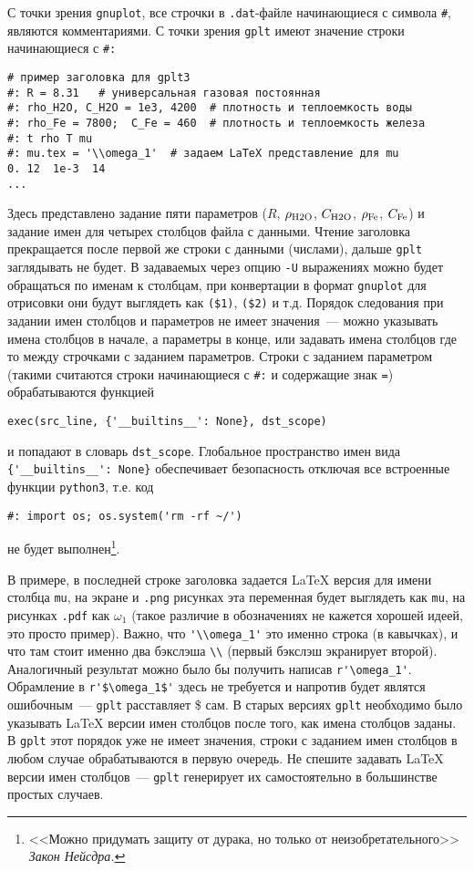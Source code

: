 \documentclass[12pt]{article}
\def\gplt{{\tt gplt}}
\def\gnuplot{{\tt gnuplot}}
\def\python{{\tt python3}}
\def\png{{\tt .png}}
\def\pdf{{\tt .pdf}}
\begin{document}
С точки зрения \gnuplot, все строчки в \verb'.dat'-файле начинающиеся с символа \verb'#', являются комментариями. С точки зрения \gplt{}
имеют значение строки начинающиеся с \verb'#:'
\begin{verbatim}
# пример заголовка для gplt3
#: R = 8.31   # универсальная газовая постоянная
#: rho_H2O, C_H2O = 1e3, 4200  # плотность и теплоемкость воды
#: rho_Fe = 7800;  C_Fe = 460  # плотность и теплоемкость железа
#: t rho T mu
#: mu.tex = '\\omega_1'  # задаем LaTeX представление для mu
0. 12  1e-3  14
...
\end{verbatim}
Здесь представлено задание пяти параметров ($R$, $\rho_{\rm H2O}$, $C_{\rm H2O}$, $\rho_{\rm Fe}$, $C_{\rm Fe}$) и задание имен для четырех столбцов файла с данными.
Чтение заголовка прекращается после первой же строки с данными (числами), дальше \gplt{} заглядывать не будет. В задаваемых через опцию \verb'-U'
выражениях  можно будет обращаться по именам к столбцам, при конвертации в формат \gnuplot{} для отрисовки они будут выглядеть как \verb'($1)', \verb'($2)' и т.д.
Порядок следования при задании имен столбцов и параметров не имеет значения~--- можно указывать имена столбцов в начале, а параметры в конце, или задавать имена столбцов
где то между строчками с заданием параметров. Строки с заданием параметром (такими считаются строки начинающиеся с \verb'#:' и содержащие знак \verb'=')
обрабатываются функцией
\begin{verbatim}
exec(src_line, {'__builtins__': None}, dst_scope)
\end{verbatim}
и попадают в словарь \verb'dst_scope'. Глобальное пространство имен вида \verb|{'__builtins__': None}| обеспечивает безопасность отключая все
встроенные функции \python{}, т.е. код
\begin{verbatim}
#: import os; os.system('rm -rf ~/')
\end{verbatim}
не будет выполнен\footnote{<<Можно придумать защиту от дурака, но только от неизобретательного>> {\it Закон Нейсдра.}}. 


В примере, в последней строке заголовка задается \LaTeX{} версия для имени столбца \verb'mu', на экране и \png{} рисунках эта переменная
будет выглядеть как \verb'mu', на рисунках \pdf{} как $\omega_1$ (такое различие в обозначениях не кажется хорошей идеей, это просто пример).
Важно, что \verb|'\\omega_1'| это именно строка (в кавычках), и что там стоит именно два бэкслэша \verb'\\' (первый бэкслэш экранирует второй).
Аналогичный результат можно было бы получить написав \verb|r'\omega_1'|. Обрамление в \verb|r'$\omega_1$'| здесь не требуется и напротив будет являтся
ошибочным~--- \gplt{} расставляет \$ сам.
В старых версиях \verb'gplt' необходимо было указывать \LaTeX{} версии имен столбцов после того, как имена столбцов заданы.
В \gplt{} этот порядок уже не имеет значения, строки с заданием имен столбцов в любом случае обрабатываются в первую очередь.
Не спешите задавать \LaTeX{} версии имен столбцов~--- \gplt{} генерирует их самостоятельно в большинстве простых случаев.
\end{document}
